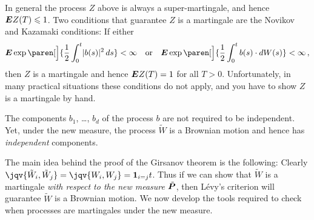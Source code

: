 \begin{remark}
  In general the process $Z$ above is always a super-martingale, and hence $\E Z(T) \leq 1$.
  Two conditions that guarantee $Z$ is a martingale are the Novikov and Kazamaki conditions:
  If either
  \begin{equation*}
    \E \exp\paren[\Big]{ \frac{1}{2} \int_0^t \abs{b(s)}^2 \, ds } < \infty
    \quad\text{or}\quad
    \E \exp\paren[\Big]{ \frac{1}{2} \int_0^t b(s) \cdot dW(s) } < \infty\,,
  \end{equation*}
  then $Z$ is a martingale and hence $\E Z(T) = 1$ for all $T > 0$.
  Unfortunately, in many practical situations these conditions do not apply, and you have to show $Z$ is a martingale by hand.
\end{remark}
\begin{remark}
  The components $b_1$, \dots, $b_d$ of the process $b$ are not required to be independent.
  Yet, under the new measure, the process $\tilde W$ is a Brownian motion and hence has \emph{independent} components.
\end{remark}

The main idea behind the proof of the Girsanov theorem is the following:
Clearly $\jqv{\tilde W_i, \tilde W_j} = \jqv{W_i, W_j} = \one_{i= j} t$.
Thus if we can show that $\tilde W$ is a martingale \emph{with respect to the new measure $\tilde\P$}, then L\'evy's criterion will guarantee $\tilde W$ is a Brownian motion.
We now develop the tools required to check when processes are martingales under the new measure.

